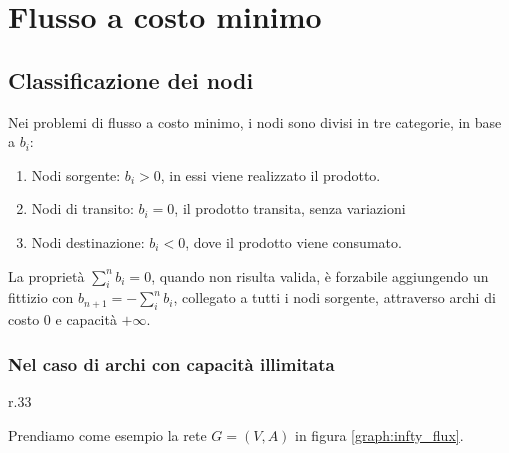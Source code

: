 \documentclass[../template]{subfiles}
\begin{document}
\section{Flusso a costo minimo}
\begin{center}
\end{center}
\subsection{Classificazione dei nodi}
Nei problemi di flusso a costo minimo, i nodi sono divisi in tre categorie, in base a $b_i$:
\begin{enumerate}
    \item Nodi sorgente: $b_i > 0$, in essi viene realizzato il prodotto.
    \item Nodi di transito: $b_i = 0$, il prodotto transita, senza variazioni
    \item Nodi destinazione: $b_i < 0$, dove il prodotto viene consumato.
\end{enumerate}
La proprietà $\sum_i^n b_i = 0$, quando non risulta valida, è forzabile aggiungendo un fittizio
con $b_{n+1} = -\sum_i^n b_i$, collegato a tutti i nodi sorgente, attraverso archi di costo 0 e capacità $+\infty$.

\subsubsection{Nel caso di archi con capacità illimitata}
\begin{wrapfigure}{r}{.33\textwidth}
    \centering
    \caption{$b_i$ sono indicati vicino al nodo}
    \label{graph:infty_flux}
\end{wrapfigure}
Prendiamo come esempio la rete $G = (V, A)$ in figura \ref{graph:infty_flux}.
\end{document}
